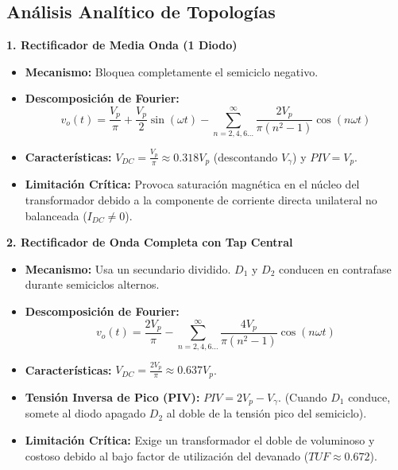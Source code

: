 \documentclass[11pt, a4paper]{article}
\begin{document}
\subsection*{Análisis Analítico de Topologías}

\textbf{1. Rectificador de Media Onda (1 Diodo)}
\begin{itemize}
    \item \textbf{Mecanismo:} Bloquea completamente el semiciclo negativo.
    \item \textbf{Descomposición de Fourier:} 
    \begin{equation}
        v_o(t) = \frac{V_p}{\pi} + \frac{V_p}{2}\sin(\omega t) - \sum_{n=2,4,6\dots}^\infty \frac{2V_p}{\pi(n^2-1)}\cos(n\omega t)
    \end{equation}
    \item \textbf{Características:} $V_{DC} = \frac{V_p}{\pi} \approx 0.318 V_p$ (descontando $V_\gamma$) y $PIV = V_p$.
    \item \textbf{Limitación Crítica:} Provoca saturación magnética en el núcleo del transformador debido a la componente de corriente directa unilateral no balanceada ($I_{DC} \neq 0$).
\end{itemize}

\textbf{2. Rectificador de Onda Completa con Tap Central}
\begin{itemize}
    \item \textbf{Mecanismo:} Usa un secundario dividido. $D_1$ y $D_2$ conducen en contrafase durante semiciclos alternos.
    \item \textbf{Descomposición de Fourier:} 
    \begin{equation}
        v_o(t) = \frac{2V_p}{\pi} - \sum_{n=2,4,6\dots}^\infty \frac{4V_p}{\pi(n^2-1)}\cos(n\omega t)
    \end{equation}
    \item \textbf{Características:} $V_{DC} = \frac{2V_p}{\pi} \approx 0.637 V_p$.
    \item \textbf{Tensión Inversa de Pico (PIV):} $PIV = 2V_p - V_\gamma$. (Cuando $D_1$ conduce, somete al diodo apagado $D_2$ al doble de la tensión pico del semiciclo).
    \item \textbf{Limitación Crítica:} Exige un transformador el doble de voluminoso y costoso debido al bajo factor de utilización del devanado ($TUF \approx 0.672$).
\end{itemize}
\end{document}
